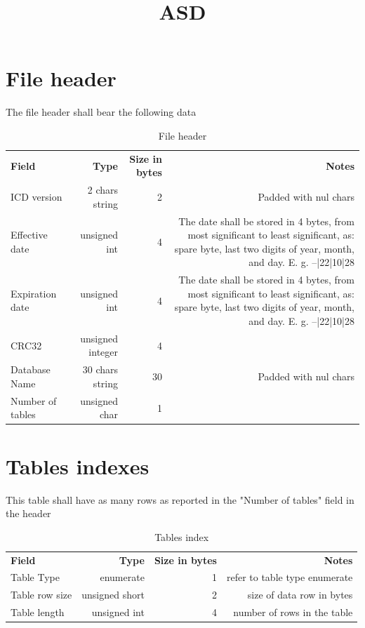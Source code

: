 \documentclass{article}
\title{ASD}
\newcommand\strpad{Padded with nul chars}
\newcommand\DateType{The date shall be stored in 4 bytes, from most significant to least significant, as: spare byte, last two digits of year, month, and day. E. g. --|22|10|28}
\begin{document}
\section{File header}
The file header shall bear the following data
\begin{table}[H]
   \caption{File header} 
   \label{tab:HEADER}
   \small
   \begin{tabular}{|l|r|r|r|}
   \textbf{Field} & \textbf{Type} & \textbf{Size in bytes} & \textbf{Notes} \\ 
   ICD version & 2 chars string & 2 & \strpad\\
   Effective date & unsigned int & 4 & \DateType \\
   Expiration date & unsigned int & 4 & \DateType \\
   CRC32 & unsigned integer & 4& \\
   Database Name & 30 chars string & 30 & \strpad\\
   Number of tables & unsigned char & 1 & \\
   \end{tabular}
\end{table}
\section{Tables indexes}
This table shall have as many rows as reported in the "Number of tables" field in the header
\begin{table}[H]
   \caption{Tables index} 
   \label{tab:TAB_INDEXES}
   \small
   \begin{tabular}{|l|r|r|r|}
   \textbf{Field} & \textbf{Type} & \textbf{Size in bytes} & \textbf{Notes} \\ 
   Table Type & enumerate & 1 & refer to table type enumerate\\
   Table row size & unsigned short & 2 & size of data row in bytes \\
   Table length & unsigned int & 4 & number of rows in the table\\
   \end{tabular}
\end{table}
\end{document}
